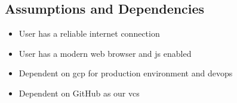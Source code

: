     \subsection{Assumptions and Dependencies}\label{sec:assumptions-dependencies}
        \begin{itemize}
            \item User has a reliable internet connection
            \item User has a modern web browser and \acrlong{js} enabled
            \item Dependent on \gls{gcp} for production environment and \gls{devops}
            \item Dependent on GitHub as our \gls{vcs}
        \end{itemize}

